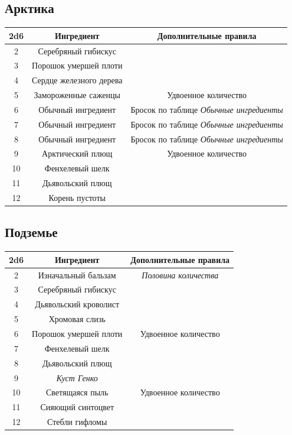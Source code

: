\documentclass[a4paper, 9pt, twocolumn]{book}
\begin{document}
\subsection{Арктика}

\begin{tabular}{|c|c|c|}
	\hline
	\textbf{2d6} & \textbf{Ингредиент} & \textbf{Дополнительные правила} \\
	\hline
	2 & Серебряный гибискус &  \\
	\hline
	3 & Порошок умершей плоти &  \\
	\hline
	4 & Сердце железного дерева &  \\
	\hline
	5 & Замороженные саженцы & Удвоенное количество \\
	\hline
	6 & Обычный ингредиент & Бросок по таблице \textit{Обычные ингредиенты} \\
	\hline
	7 & Обычный ингредиент & Бросок по таблице \textit{Обычные ингредиенты} \\
	\hline
	8 & Обычный ингредиент & Бросок по таблице \textit{Обычные ингредиенты} \\
	\hline
	9 & Арктический плющ & Удвоенное количество \\
	\hline
	10 & Фенхелевый шелк &  \\
	\hline
	11 & Дьявольский плющ &  \\
	\hline
	12 & Корень пустоты &  \\
	\hline
\end{tabular}

\subsection{Подземье}

\begin{tabular}{|c|c|c|}
	\hline
	\textbf{2d6} & \textbf{Ингредиент} & \textbf{Дополнительные правила} \\
	\hline
	2 & Изначальный бальзам & \textit{Половина количества} \\
	\hline
	3 & Серебряный гибискус &  \\
	\hline
	4 & Дьявольский кроволист &  \\
	\hline
	5 & Хромовая слизь &  \\
	\hline
	6 & Порошок умершей плоти & Удвоенное количество \\
	\hline
	7 & Фенхелевый шелк &  \\
	\hline
	8 & Дьявольский плющ &  \\
	\hline
	9 & \textit{Куст Генко} &  \\
	\hline
	10 & Светящаяся пыль & Удвоенное количество \\
	\hline
	11 & Сияющий синтоцвет &  \\
	\hline
	12 & Стебли гифломы &  \\
	\hline
\end{tabular}
	
	
	
	
	
	
	
	
	
	
	
	
	
	
	
\end{document}
